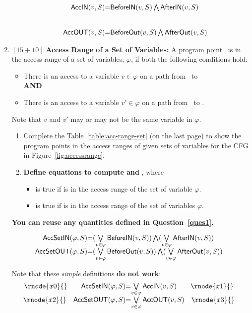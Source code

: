 \documentclass[12pt]{article}
\newcommand{\answer}[1]{{{\blue #1}}}
\begin{document}
\begin{enumerate}
\begin{enumerate}
{\[
\begin{array}{@{}r@{}c@{}l}
\inacc{v}{S} &=& \indef{v}{S} \bigwedge \inuse{v}{S} \\ \\ \\
\outacc{v}{S} &=& \outdef{v}{S} \bigwedge \outuse{v}{S}
\end{array}\]

}
\end{enumerate}
\answer{\clearpage}
\newcommand{\vset}{\ensuremath{\varphi}}
\item $[15+10]$  {\bf Access Range of a Set of Variables:} A program point \pt\ is in the access range of a set of variables, \vset, if both the following conditions hold:
  \begin{itemize}
  \item  There is an access to a variable $v \in \vset$ on a path from \fgentry\ to \pt \\[5pt] {\bf AND}
  \item There is an access to a variable $v' \in \vset$ on a path from \pt\ to \fgexit. 
  \end{itemize}
Note that $v$ and $v'$ may or may not be the same variable in \vset.
\begin{enumerate}
\item Complete the Table~\ref{table:acc-range-set} (on the last
  page) to show the program points in the access ranges of given
  sets of variables for the CFG in Figure~\ref{fig:accessrange}.
\item {\bf Define equations to compute \inaccset{S}{\vset} and \outaccset{S}{\vset}}, where
\begin{itemize}
\item \inaccset{S}{\vset} is true if  is in the access range of the set of variable $\vset$.  
\item \outaccset{S}{\vset} is true if 
  is in the access range of the set of variables $\vset$.
\end{itemize}
\end{enumerate}
{\bf You can reuse any quantities defined in Question~\ref{ques1}.}
\answer{
\[
\begin{array}{@{}r@{}c@{}l}
\inaccset{\varphi}{S} &=& (\bigvee\limits_{v \in \varphi} \indef{v}{S}) \bigwedge (\bigvee\limits_{v \in \varphi} \inuse{v}{S}) \\
\outaccset{\varphi}{S} &=& (\bigvee\limits_{v \in \varphi} \outdef{v}{S}) \bigwedge (\bigvee\limits_{v \in \varphi} \outuse{v}{S}) 
\end{array}\]
{\color{red}
Note that these {\em simple} definitions {\bf do not work}:
\[\begin{array}{@{}r@{}c@{}l}
\rnode{x0}{}\qquad\inaccset{\varphi}{S}  &=& \bigvee\limits_{v \in \varphi}\inacc{v}{S}\qquad \rnode{x1}{}\\
\rnode{x2}{}\quad\outaccset{\varphi}{S} &=& \bigvee\limits_{v \in \varphi}\outacc{v}{S}\quad\rnode{x3}{}\\
\end{array}\]

}}
\end{enumerate}
\end{document}
